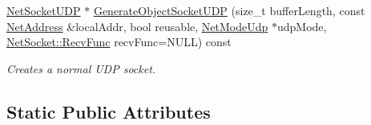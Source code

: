 \begin{DoxyCompactItemize}
\hyperlink{class_net_socket_u_d_p}{NetSocketUDP} $\ast$ \hyperlink{class_net_instance_profile_a5620819c1e617258b5abb939d1df8dd8}{GenerateObjectSocketUDP} (size\_\-t bufferLength, const \hyperlink{class_net_address}{NetAddress} \&localAddr, bool reusable, \hyperlink{class_net_mode_udp}{NetModeUdp} $\ast$udpMode, \hyperlink{class_net_socket_a52b5f4de8d0a47fd8620f542b21c076c}{NetSocket::RecvFunc} recvFunc=NULL) const 
\begin{DoxyCompactList}\small\item\em Creates a normal UDP socket. \item\end{DoxyCompactList}\end{DoxyCompactItemize}
\subsection*{Static Public Attributes}
